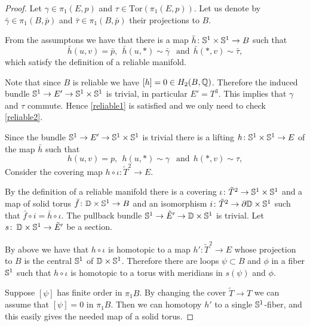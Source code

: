 \documentclass{amsart}
\begin{document}
\begin{proof}
Let $\gamma\in \pi_1(E,p)$ and $\tau\in \mathrm{Tor}(\pi_1(E,p))$. 
Let us denote by $\bar\gamma\in \pi_1(B,\bar p)$ and 
$\bar\tau\in \pi_1(B,\bar p)$ their projections to $B$.

From the assumptons we have 
that there is a map 
$\bar h\colon {\Bbb S}^1\times {\Bbb S}^1\to B$ such that 
$$\bar h(u,v)=\bar p,\ \ 
\bar h(u,*)\sim\bar\gamma\ \ \text{ and}\ \ 
\bar h(*,v)\sim\bar\tau,$$
which satisfy the definition of a reliable manifold.

Note that since $B$ is reliable we have $[h]=0\in H_2(B,{\Bbb Q})$. Therefore the induced bundle ${\Bbb S}^1\to E'\to {\Bbb S}^1\times {\Bbb S}^1$ is trivial, in particular $E'=T^3$. This  implies that $\gamma$ and $\tau$ commute. Hence \eqref{reliable1} is satisfied and we only need to check \eqref{reliable2}.

Since the bundle  ${\Bbb S}^1\to E'\to {\Bbb S}^1\times {\Bbb S}^1$ is trivial there is a lifting $h\colon {\Bbb S}^1\times {\Bbb S}^1\to E$ of the map $\bar h$ such that
$$ h(u,v)= p,\ \ 
 h(u,*)\sim\gamma\ \ \text{ and}\ \ 
 h(*,v)\sim\tau,$$
Consider the covering map $h\circ\iota\colon \tilde T^2\to E$.

By the definition of a reliable manifold there is a covering $\iota\colon \tilde T^2\z\to {\Bbb S}^1\times {\Bbb S}^1$ and a map of solid torus $\bar f\colon \DD\times {\Bbb S}^1\z\to B$ and an isomorphism $i\colon \tilde T^2\to \partial \DD\times {\Bbb S}^1$ such that $\bar f\circ i=\bar h\circ\iota$. The pullback bundle $\S^1\to \tilde E'\to \DD\times \S^1$ is trivial. Let $s\co  \DD\times \S^1\to  \tilde E'$ be a section.

By above 
we have that $h\circ\iota$ is homotopic to a map
$h'\colon \tilde T^2\to E$ whose projection to $B$ is the central ${\Bbb S}^1$ of 
$\DD\times {\Bbb S}^1$. 
Therefore there are loops $\psi\subset B$ and $\phi$ in a fiber $\S^1$  such that $h\circ\iota$ is homotopic to a torus with meridians in $s(\psi)$ and $\phi$.

Suppose 
$[\psi]$ has finite order in $\pi_1B$. By changing the cover $\tilde T\to T$ we can assume that $[\psi]=0$  in $\pi_1B$.  Then we can homotopy $h'$ to a single ${\Bbb S}^1$-fiber, and this easily gives the needed map of  a solid torus.


\end{proof}
\end{document}
